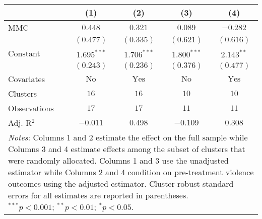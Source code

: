 
\begin{tabular}{l c c c c}
\toprule
 & (1) & (2) & (3) & (4) \\
\midrule
MMC          & $0.448$       & $0.321$        & $0.089$       & $-0.282$       \\
             & $(0.477)$     & $(0.335)$      & $(0.621)$     & $(0.616)$      \\
Constant     & $1.695^{***}$ & $1.706^{***}$  & $1.800^{***}$ & $2.143^{**}$   \\
             & $(0.243)$     & $(0.236)$      & $(0.376)$     & $(0.477)$      \\
\midrule
Covariates   & $\textrm{No}$ & $\textrm{Yes}$ & $\textrm{No}$ & $\textrm{Yes}$ \\
Clusters     & $16$          & $16$           & $10$          & $10$           \\
Observations & $17$          & $17$           & $11$          & $11$           \\
Adj. R$^2$   & $-0.011$      & $0.498$        & $-0.109$      & $0.308$        \\
\bottomrule
\multicolumn{5}{l}{\scriptsize{\parbox{.5\linewidth}{\vspace{2pt} 
       \textit{Notes:} Columns 1 and 2 estimate the effect on the full sample while Columns 3 
       and 4 estimate effects among the subset of clusters that were randomly allocated.
       Columns 1 and 3 use the unadjusted estimator while Columns 2 and 4 condition on 
       pre-treatment violence outcomes using the adjusted estimator. Cluster-robust 
       standard errors for all estimates are reported in parentheses. \\ $^{***}p<0.001$; $^{**}p<0.01$; $^{*}p<0.05$.}}}
\end{tabular}
